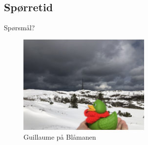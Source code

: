 \subsection*{Spørretid}
\begin{frame}{Spørsmål?}
    \begin{figure}
        \centering
        \includegraphics[height = 4.9cm]{images/guillaume6.jpg}
        \caption{Guillaume på Blåmanen}
        \label{fig:guillaume6}
    \end{figure}
\end{frame}